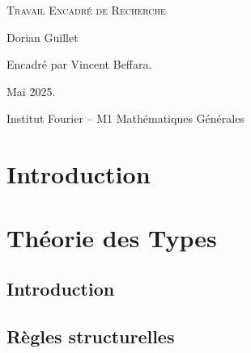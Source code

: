 \documentclass[a4paper, 11pt, twoside]{article}
\title{\Title}
\author{\Author}
\date{\today}
\begin{document}
  \begin{titlepage}
    \thispagestyle{empty}
    \begin{center}
      \vspace*{1cm}

      \large
      \textsc{Travail Encadré de Recherche}
      \vspace{1.5cm}

      \huge\textbf{\Title}
      \vspace{2cm}

      \large
      Dorian Guillet
      \vspace{1cm}

      Encadré par Vincent Beffara.

      \vfill
      Mai 2025.
      \vspace{0.5cm}

      Institut Fourier -- M1 Mathématiques Générales
      \vspace*{1.5cm}
    \end{center}
  \end{titlepage}

  \newpage
  \tableofcontents
  \thispagestyle{empty}

  \newpage
  \setcounter{page}{1}

  \section{Introduction}
    
    \newpage

  \section{Théorie des Types}
    \subsection{Introduction}
      

    \subsection{Règles structurelles}
      
\end{document}

